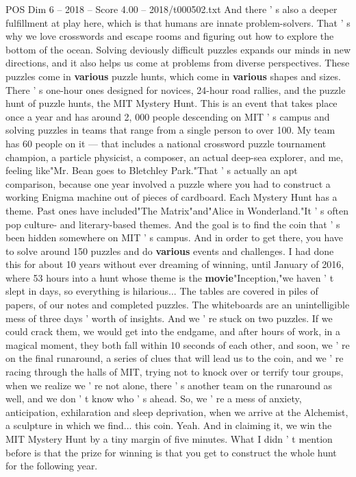 \begin{textsample}{POS Dim 6 – 2018 – Score 4.00 – 2018/t000502.txt}
And there ' s also a deeper fulfillment at play here, which is that humans are innate problem-solvers.
That ' s why we love crosswords and escape rooms and figuring out how to explore the bottom of the ocean.
Solving deviously difficult puzzles expands our minds in new directions, and it also helps us come at problems from diverse perspectives.
These puzzles come in \textbf{various} puzzle hunts, which come in \textbf{various} shapes and sizes.
There ' s one-hour ones designed for novices, 24-hour road rallies, and the puzzle hunt of puzzle hunts, the MIT Mystery Hunt.
This is an event that takes place once a year and has around 2, 000 people descending on MIT ' s campus and solving puzzles in teams that range from a single person to over 100.
My team has 60 people on it — that includes a national crossword puzzle tournament champion, a particle physicist, a composer, an actual deep-sea explorer, and me, feeling like"Mr.
Bean goes to Bletchley Park."That ' s actually an apt comparison, because one year involved a puzzle where you had to construct a working Enigma machine out of pieces of cardboard.
Each Mystery Hunt has a theme.
Past ones have included"The Matrix"and"Alice in Wonderland."It ' s often pop culture- and literary-based themes.
And the goal is to find the coin that ' s been hidden somewhere on MIT ' s campus.
And in order to get there, you have to solve around 150 puzzles and do \textbf{various} events and challenges.
I had done this for about 10 years without ever dreaming of winning, until January of 2016, where 53 hours into a hunt whose theme is the \textbf{movie}"Inception,"we haven ' t slept in days, so everything is hilarious...
The tables are covered in piles of papers, of our notes and completed puzzles.
The whiteboards are an unintelligible mess of three days ' worth of insights.
And we ' re stuck on two puzzles.
If we could crack them, we would get into the endgame, and after hours of work, in a magical moment, they both fall within 10 seconds of each other, and soon, we ' re on the final runaround, a series of clues that will lead us to the coin, and we ' re racing through the halls of MIT, trying not to knock over or terrify tour groups, when we realize we ' re not alone, there ' s another team on the runaround as well, and we don ' t know who ' s ahead.
So, we ' re a mess of anxiety, anticipation, exhilaration and sleep deprivation, when we arrive at the Alchemist, a sculpture in which we find... this coin.
Yeah.
And in claiming it, we win the MIT Mystery Hunt by a tiny margin of five minutes.
What I didn ' t mention before is that the prize for winning is that you get to construct the whole hunt for the following year.

\end{textsample}
